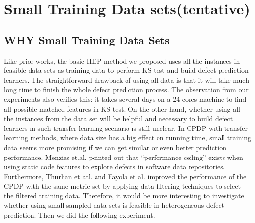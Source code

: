 \section{Small Training Data sets(tentative)}
\label{sec: small_data_sets}

\subsection{WHY Small Training Data Sets}

Like prior works\cite{nam2013transfer,
  ma2012transfer, rahman2012recalling, ryu2014value,
  zhang2014towards}, the basic HDP method we
proposed uses all the instances in feasible data
sets as training data to perform KS-test and build
defect prediction learners. The straightforward
drawback of using all data is that it will take much
long time to finish the whole defect prediction
process. The observation from our experiments also
verifies this: it takes several days on a 24-cores
machine to find all possible matched features in
KS-test. On the other hand, whether using all the
instances from the data set will be helpful and
necessary to build defect learners in such transfer
learning scenario is still unclear. In CPDP with
transfer learning methods, where data size has a big
effect on running time, small training data seems
more promising if we can get similar or even better
prediction performance. Menzies
et.al. \cite{menzies2008implications} pointed out
that ``performance ceiling'' exists when using
static code features to explore defects in software
data repositories.  Furthermore, Thurhan et
atl.\cite{turhan2009relative} and Fayola et
al.\cite{peters2013better} improved the performance
of the CPDP with the same metric set by applying
data filtering techniques to select the filtered
training data. Therefore, it would be more
interesting to investigate whether using small
sampled data sets is feasible in heterogeneous
defect prediction. Then we did the following
experiment.


